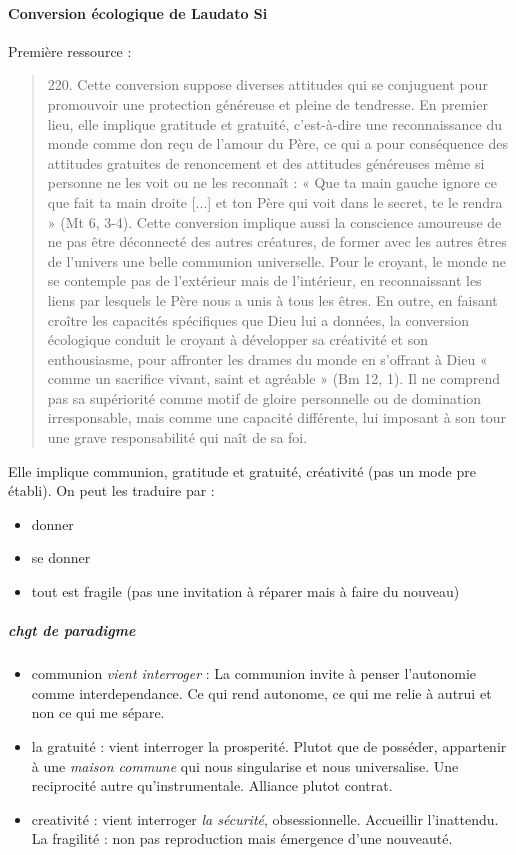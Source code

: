 \paragraph{Conversion écologique de Laudato Si} Première ressource : 
\begin{quote}
    220. Cette conversion suppose diverses attitudes qui se conjuguent pour promouvoir une protection généreuse et pleine de tendresse. En premier lieu, elle implique gratitude et gratuité, c’est-à-dire une reconnaissance du monde comme don reçu de l’amour du Père, ce qui a pour conséquence des attitudes gratuites de renoncement et des attitudes généreuses même si personne ne les voit ou ne les reconnaît : « Que ta main gauche ignore ce que fait ta main droite [...] et ton Père qui voit dans le secret, te le rendra » (Mt 6, 3-4). Cette conversion implique aussi la conscience amoureuse de ne pas être déconnecté des autres créatures, de former avec les autres êtres de l’univers une belle communion universelle. Pour le croyant, le monde ne se contemple pas de l’extérieur mais de l’intérieur, en reconnaissant les liens par lesquels le Père nous a unis à tous les êtres. En outre, en faisant croître les capacités spécifiques que Dieu lui a données, la conversion écologique conduit le croyant à développer sa créativité et son enthousiasme, pour affronter les drames du monde en s’offrant à Dieu « comme un sacrifice vivant, saint et agréable » (Bm 12, 1). Il ne comprend pas sa supériorité comme motif de gloire personnelle ou de domination irresponsable, mais comme une capacité différente, lui imposant à son tour une grave responsabilité qui naît de sa foi.
\end{quote}
Elle implique communion, gratitude et gratuité, créativité (pas un mode pre établi). On peut les traduire par : 
\begin{itemize}
    \item donner
    \item se donner
    \item tout est fragile (pas une invitation à réparer mais à faire du nouveau)
\end{itemize}

\subparagraph{chgt de paradigme}
\begin{itemize}
    \item communion \textit{vient interroger} : La communion invite à penser l'autonomie comme interdependance. Ce qui rend autonome, ce qui me relie à autrui et non ce qui me sépare.
    \item la gratuité : vient interroger la prosperité. Plutot que de posséder, appartenir à une \textit{maison commune} qui nous singularise et nous universalise. Une reciprocité autre qu'instrumentale. Alliance plutot contrat.
    \item creativité : vient interroger \textit{la sécurité}, obsessionnelle. Accueillir l'inattendu. La fragilité : non pas reproduction mais émergence d'une nouveauté. 
\end{itemize}

